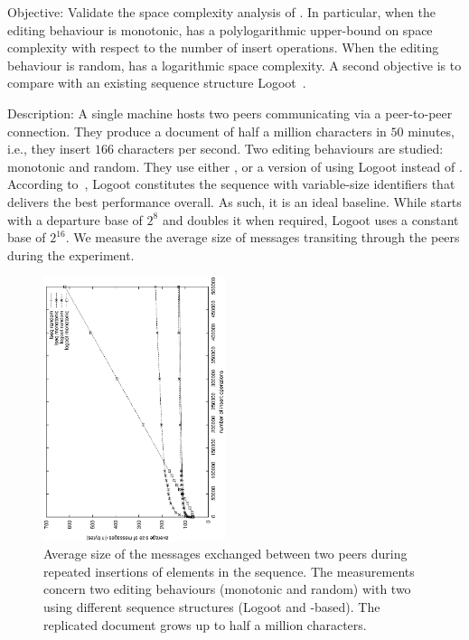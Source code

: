 \begin{asparadesc}
\item [Objective:] Validate the space complexity analysis of \NAME{}. In
  particular, when the editing behaviour is monotonic, \NAME{} has a
  polylogarithmic upper-bound on space complexity with respect to the number of
  insert operations. When the editing behaviour is random, \NAME{} has a
  logarithmic space complexity. A second objective is to compare \NAME{} with
  an existing sequence structure
  Logoot~\cite{weiss2009logoot,weiss2010logootundo}.
\item [Description:] A single machine hosts two peers communicating via a
  peer-to-peer connection. They produce a document of half a million characters
  in $50$ minutes, i.e., they insert $166$ characters per second. Two editing
  behaviours are studied: monotonic and random. They use either \EDITORNAME{},
  or a version of \EDITORNAME{} using Logoot instead of \NAME{}. According
  to~\cite{ahmed2011evaluating}, Logoot constitutes the sequence with
  variable-size identifiers that delivers the best performance overall. As
  such, it is an ideal baseline. While \NAME{} starts with a departure base of
  $2^8$ and doubles it when required, Logoot uses a constant base of
  $2^{16}$. We measure the average size of messages transiting through the
  peers during the experiment.

\begin{figure}
  \centering
  \includegraphics[angle=-90,width=0.475\textwidth]{./img/complexities.eps}
  \caption{\label{fig:complexities} Average size of the messages exchanged
    between two peers during repeated insertions of elements in the
    sequence. The measurements concern two editing behaviours (monotonic and
    random) with two \EDITORNAME{} using different sequence structures (Logoot
    and \NAME{}-based). The replicated document grows up to half a million
    characters.}
\end{figure}


\end{asparadesc}
